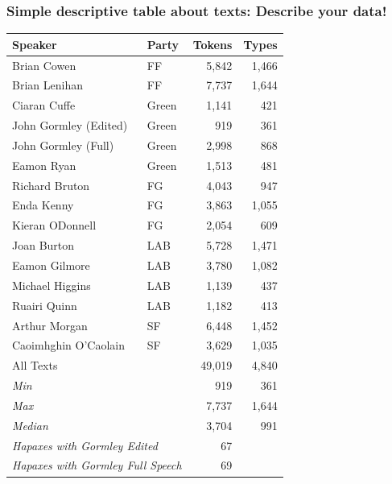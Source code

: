 \documentclass[11pt,handout]{beamer}
\begin{document}
\begin{frame}
  \frametitle{Simple descriptive table about texts: Describe your data!}
\scriptsize
  \centering
  \begin{tabular}{llrr}
\hline
Speaker		&	Party	&	Tokens	&
Types	\\
\hline\hline
Brian	Cowen	&	FF	&	 5,842 	&	 1,466 	\\
Brian	Lenihan	&	FF	&	 7,737 	&	 1,644 	\\
Ciaran	Cuffe	&	Green	&	 1,141 	&	 421 	\\
John	Gormley	(Edited) &	Green	&	 919 	&	 361 	\\
John	Gormley (Full)	&	Green	&	 2,998 	&	 868 	\\
Eamon	Ryan	&	Green	&	 1,513 	&	 481 	\\
Richard	Bruton	&	FG	&	 4,043 	&	 947 	\\
Enda	Kenny	&	FG	&	 3,863 	&	 1,055 	\\
Kieran	ODonnell	&	FG	&	 2,054 	&	 609 	\\
Joan	Burton	&	LAB	&	 5,728 	&	 1,471 	\\
Eamon	Gilmore	&	LAB	&	 3,780 	&	 1,082 	\\
Michael	Higgins	&	LAB	&	 1,139 	&	 437 	\\
Ruairi	Quinn	&	LAB	&	 1,182 	&	 413 	\\
Arthur	Morgan	&	SF	&	 6,448 	&	 1,452 	\\
Caoimhghin	O'Caolain	&	SF	&	 3,629 	&
1,035 	\\[1ex]
All Texts & & 49,019 & 4,840 \\[1ex]
\multicolumn{2}{l}{\emph{Min}}	&	 919 	&	 361 	\\
\multicolumn{2}{l}{\emph{Max}}	&	 7,737 	&	 1,644 	\\
\multicolumn{2}{l}{\emph{Median}}	&	 3,704 	&	 991 \\
\multicolumn{2}{l}{\em Hapaxes with Gormley Edited} & 67                 \\
\multicolumn{2}{l}{\em Hapaxes with Gormley Full Speech} & 69                 \\
\hline
  \end{tabular}

\end{frame}
\end{document}
